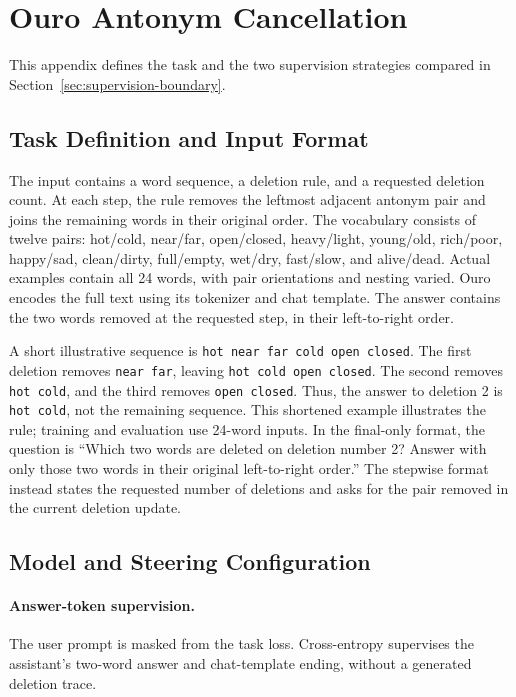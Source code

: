 \documentclass{article}
\begin{document}
\section{Ouro Antonym Cancellation}
\label{app:supervision}
This appendix defines the task and the two supervision strategies compared in Section~\ref{sec:supervision-boundary}.

\subsection{Task Definition and Input Format}
The input contains a word sequence, a deletion rule, and a requested deletion count. At each step, the rule removes the leftmost adjacent antonym pair and joins the remaining words in their original order. The vocabulary consists of twelve pairs: hot/cold, near/far, open/closed, heavy/light, young/old, rich/poor, happy/sad, clean/dirty, full/empty, wet/dry, fast/slow, and alive/dead. Actual examples contain all 24 words, with pair orientations and nesting varied. Ouro encodes the full text using its tokenizer and chat template. The answer contains the two words removed at the requested step, in their left-to-right order.

A short illustrative sequence is \texttt{hot near far cold open closed}. The first deletion removes \texttt{near far}, leaving \texttt{hot cold open closed}. The second removes \texttt{hot cold}, and the third removes \texttt{open closed}. Thus, the answer to deletion 2 is \texttt{hot cold}, not the remaining sequence. This shortened example illustrates the rule; training and evaluation use 24-word inputs. In the final-only format, the question is ``Which two words are deleted on deletion number 2? Answer with only those two words in their original left-to-right order.'' The stepwise format instead states the requested number of deletions and asks for the pair removed in the current deletion update.

\subsection{Model and Steering Configuration}
\paragraph{Answer-token supervision.}
The user prompt is masked from the task loss. Cross-entropy supervises the assistant's two-word answer and chat-template ending, without a generated deletion trace.
\end{document}
